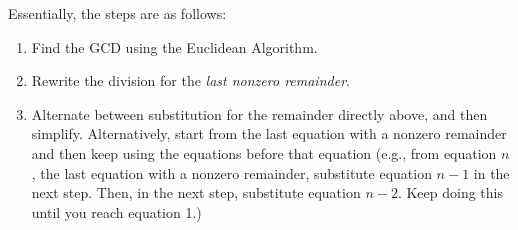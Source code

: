 \documentclass[letterpaper]{article}
\newcommand{\0}{\mathbf{0}}
\begin{document}
Essentially, the steps are as follows: 
\begin{enumerate}
    \item Find the GCD using the Euclidean Algorithm.
    \item Rewrite the division for the \emph{last nonzero remainder}. 
    \item Alternate between substitution for the remainder directly above, and then simplify. Alternatively, start from the last equation with a nonzero remainder and then keep using the equations before that equation (e.g., from equation $n$, the last equation with a nonzero remainder, substitute equation $n - 1$ in the next step. Then, in the next step, substitute equation $n - 2$. Keep doing this until you reach equation 1.)
\end{enumerate}
\end{document}
